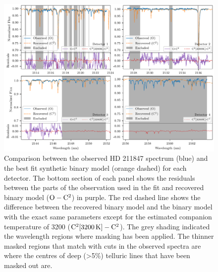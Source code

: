 \begin{figure}
    \centering
    \includegraphics[width=0.8\linewidth]{figures/companion_recovery/visualize_result_residuals}
    \caption[Comparison between observation of {HD 211847} and the best fit synthetic binary model.]{Comparison between the observed {HD 211847} spectrum (blue) and the best fit synthetic binary model (orange dashed) for each detector.
        The bottom section of each panel shows the residuals between the parts of the observation used in the \textchisquared{} fit and recovered binary model (\(\rm O-C^2\)) in purple.
        The red dashed line shows the difference between the recovered binary model and the binary model with the exact same parameters except for the estimated companion temperature of 3200\K{} (\(\rm C^2[3200\,\si{\kelvin}{}]- C^2\)).
        The grey shading indicated the wavelength regions where masking has been applied.
        The thinner masked regions that match with cuts in the observed spectra are where the centres of deep (>5\%) telluric lines that have been masked out are.}
    \label{fig:visualinspection-hd2118471}
\end{figure}
